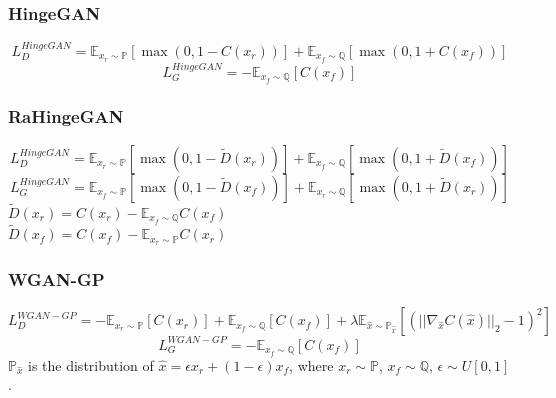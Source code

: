 \documentclass{article}
\begin{document}
\subsubsection{HingeGAN}

\begin{equation}
L_D^{HingeGAN} = \mathbb{E}_{x_r \sim \mathbb{P}}\left[ \max(0, 1-C(x_r)) \right] + \mathbb{E}_{x_f \sim \mathbb{Q}} \left[ \max(0, 1+C(x_f)) \right]
\end{equation} 
\begin{equation}
L_G^{HingeGAN} = -\mathbb{E}_{x_f \sim \mathbb{Q}} \left[ C(x_f) \right]
\end{equation}

\subsubsection{RaHingeGAN}

\begin{equation}
L_D^{HingeGAN} = \mathbb{E}_{x_r \sim \mathbb{P}}\left[ \max(0, 1-\tilde{D}(x_r)) \right] + \mathbb{E}_{x_f \sim \mathbb{Q}} \left[ \max(0, 1+\tilde{D}(x_f)) \right]
\end{equation} 
\begin{equation}
L_G^{HingeGAN} = \mathbb{E}_{x_f \sim \mathbb{P}}\left[ \max(0, 1-\tilde{D}(x_f)) \right] + \mathbb{E}_{x_r \sim \mathbb{Q}} \left[ \max(0, 1+\tilde{D}(x_r)) \right]
\end{equation}
$\tilde{D}(x_r) = C(x_r)-\mathbb{E}_{x_f \sim \mathbb{Q}} C(x_f)$ \\
$\tilde{D}(x_f) = C(x_f)-\mathbb{E}_{x_r \sim \mathbb{P}} C(x_r)$

\subsubsection{WGAN-GP}

\begin{equation}
L_D^{WGAN-GP} = -\mathbb{E}_{x_r \sim \mathbb{P}}\left[ C(x_r) \right] + \mathbb{E}_{x_f \sim \mathbb{Q}} \left[ C(x_f) \right] + \lambda \mathbb{E}_{\hat{x} \sim \mathbb{P}_{\hat{x}}} \left[ \left( || \nabla_{\hat{x}} C(\hat{x}) ||_2 - 1 \right)^2 \right]
\end{equation} 
\begin{equation}
L_G^{WGAN-GP} = -\mathbb{E}_{x_f \sim \mathbb{Q}} \left[ C(x_f) \right]
\end{equation}
$\mathbb{P}_{\hat{x}}$ is the distribution of $\hat{x} = \epsilon x_r + (1-\epsilon) x_f$, where $x_r \sim \mathbb{P}$, $x_f \sim \mathbb{Q}$, $\epsilon \sim U[0,1]$.
\end{document}
